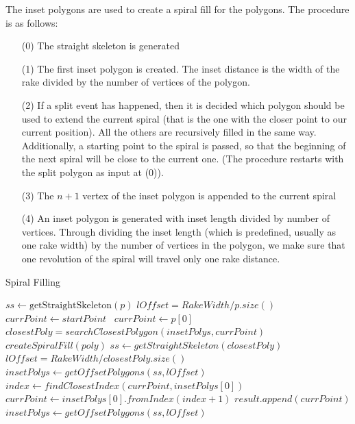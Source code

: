 The inset polygons are used to create a spiral fill for the polygons. The procedure is as follows:

\begin{itemize}
\item[(0)] The straight skeleton is generated
\item[(1)] The first inset polygon is created. The inset distance is the width of the rake divided by the number of vertices of the polygon.
\item[(2)] If a split event has happened, then it is decided which polygon should be used to extend the current spiral (that is the one with the closer point to our current position). All the others are recursively filled in the same way. Additionally, a starting point to the spiral is passed, so that the beginning of the next spiral will be close to the current one. (The procedure restarts with the split polygon as input at (0)).
\item[(3)] The $n+1$ vertex of the inset polygon is appended to the current spiral
\item[(4)] An inset polygon is generated with inset length divided by number of vertices. Through dividing the inset length (which is predefined, usually as one rake width) by the number of vertices in the polygon, we make sure that one revolution of the spiral will travel only one rake distance.

\end{itemize}

\begin{algorithm}[H]
\begin{algorithmic}
\caption{Spiral Filling}\label{spiral_fill}


\State $ss \gets \text{getStraightSkeleton}(p)$
\State $lOffset = RakeWidth/p.size()$
 $currPoint \gets startPoint$ 
\Else ~$ currPoint \gets p[0]$ 
\EndIf
{}
	\State $closestPoly = searchClosestPolygon(insetPolys, currPoint)$
		\State $createSpiralFill(poly)$
	\EndFor
	\State $ss \gets getStraightSkeleton(closestPoly)$
	\State $lOffset = RakeWidth/closestPoly.size()$
	\State $insetPolys \gets getOffsetPolygons(ss, lOffset)$
\EndIf
\State $index \gets findClosestIndex(currPoint, insetPolys[0])$
\State $currPoint \gets insetPolys[0].fromIndex(index + 1)$
\State $result.append(currPoint)$
\State $insetPolys \gets getOffsetPolygons(ss, lOffset)$
\EndWhile
\EndFunction

\end{algorithmic}

\end{algorithm}

